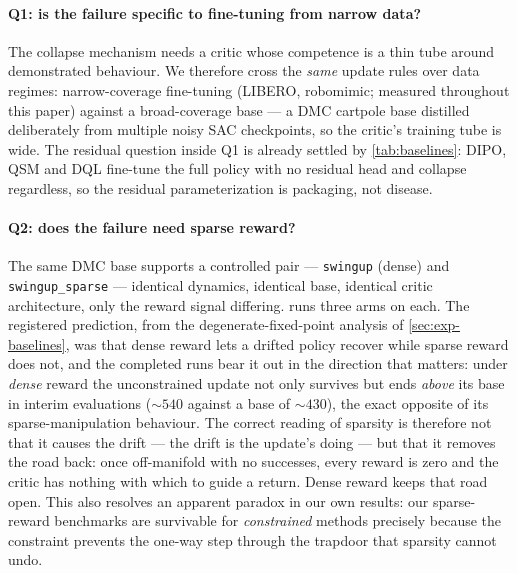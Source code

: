 \paragraph{Q1: is the failure specific to fine-tuning from narrow data?}
The collapse mechanism needs a critic whose competence is a thin tube
around demonstrated behaviour. We therefore cross the \emph{same} update
rules over data regimes: narrow-coverage fine-tuning (LIBERO, robomimic;
measured throughout this paper) against a broad-coverage base --- a DMC
cartpole base distilled deliberately from multiple noisy SAC checkpoints,
so the critic's training tube is wide. The residual question inside Q1 is
already settled by \cref{tab:baselines}: DIPO, QSM and DQL fine-tune the
full policy with no residual head and collapse regardless, so the residual
parameterization is packaging, not disease.

\paragraph{Q2: does the failure need sparse reward?}
The same DMC base supports a controlled pair --- \texttt{swingup} (dense)
and \texttt{swingup\_sparse} --- identical dynamics, identical base,
identical critic architecture, only the reward signal differing.
 runs three arms on each. The registered prediction,
from the degenerate-fixed-point analysis of \cref{sec:exp-baselines}, was
that dense reward lets a drifted policy recover while sparse reward does
not, and the completed runs bear it out in the direction that matters: under
\emph{dense} reward the unconstrained update not only survives but ends
\emph{above} its base in interim evaluations (${\sim}540$ against a base of
${\sim}430$), the exact opposite of its sparse-manipulation behaviour. The
correct reading of sparsity is therefore not that it causes the drift ---
the drift is the update's doing --- but that it removes the road back: once
off-manifold with no successes, every reward is zero and the critic has
nothing with which to guide a return. Dense reward keeps that road open.
This also resolves an apparent paradox in our own results: our sparse-reward
benchmarks are survivable for \emph{constrained} methods precisely because
the constraint prevents the one-way step through the trapdoor that
sparsity cannot undo.



